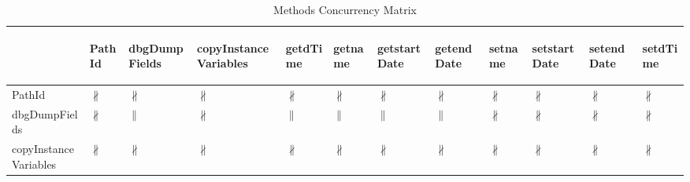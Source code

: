 \documentclass[10pt]{article}
\begin{document}
\begin{longtable}{|l|l|l|l|l|l|l|l|l|l|l|l|}
\caption{Methods Concurrency Matrix}\\
\hline
&\begin{sideways}PathId\end{sideways}&\begin{sideways}dbgDumpFields\end{sideways}&\begin{sideways}copyInstanceVariables\end{sideways}&\begin{sideways}getdTime\end{sideways}&\begin{sideways}getname\end{sideways}&\begin{sideways}getstartDate\end{sideways}&\begin{sideways}getendDate\end{sideways}&\begin{sideways}setname\end{sideways}&\begin{sideways}setstartDate\end{sideways}&\begin{sideways}setendDate\end{sideways}&\begin{sideways}setdTime\end{sideways}\\
\hline
PathId&{\color{BrickRed}$\nparallel$}&{\color{BrickRed}$\nparallel$}&{\color{BrickRed}$\nparallel$}&{\color{BrickRed}$\nparallel$}&{\color{BrickRed}$\nparallel$}&{\color{BrickRed}$\nparallel$}&{\color{BrickRed}$\nparallel$}&{\color{BrickRed}$\nparallel$}&{\color{BrickRed}$\nparallel$}&{\color{BrickRed}$\nparallel$}&{\color{BrickRed}$\nparallel$}\\
\hline
dbgDumpFields&{\color{BrickRed}$\nparallel$}&{\color{blue}$\parallel$}&{\color{BrickRed}$\nparallel$}&{\color{blue}$\parallel$}&{\color{blue}$\parallel$}&{\color{blue}$\parallel$}&{\color{blue}$\parallel$}&{\color{BrickRed}$\nparallel$}&{\color{BrickRed}$\nparallel$}&{\color{BrickRed}$\nparallel$}&{\color{BrickRed}$\nparallel$}\\
\hline
copyInstanceVariables&{\color{BrickRed}$\nparallel$}&{\color{BrickRed}$\nparallel$}&{\color{BrickRed}$\nparallel$}&{\color{BrickRed}$\nparallel$}&{\color{BrickRed}$\nparallel$}&{\color{BrickRed}$\nparallel$}&{\color{BrickRed}$\nparallel$}&{\color{BrickRed}$\nparallel$}&{\color{BrickRed}$\nparallel$}&{\color{BrickRed}$\nparallel$}&{\color{BrickRed}$\nparallel$}\\

\end{longtable}
\end{document}
